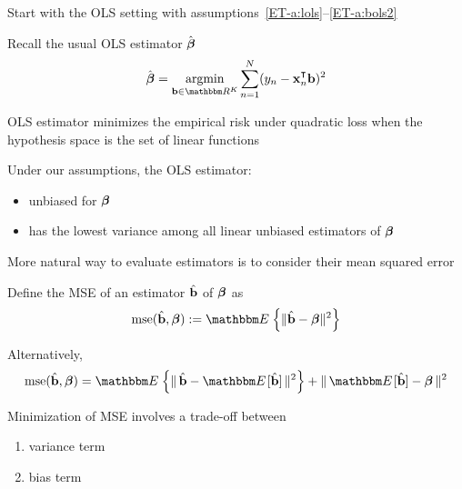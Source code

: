 \begin{frame}

    \vspace{2em}
    Start with the OLS setting with assumptions~\ref{ET-a:lols}--\ref{ET-a:bols2}
    
    Recall the usual OLS estimator $\hat {\boldsymbol \beta}$ 
    \begin{equation*}
        \hboldbeta = \argmin_{\boldb \in \RR^K} \sum_{n=1}^N (y_n - \boldx_n^\T \boldb)^2
    \end{equation*}
    
    \vspace{.7em}
    OLS estimator minimizes the
    empirical risk under quadratic loss when the hypothesis space is
    the set of linear functions
    
    Under our assumptions, the OLS estimator: 
    \begin{itemize}
        \item unbiased for ${\boldsymbol \beta}$
        \item has the lowest variance among all linear unbiased estimators of
    ${\boldsymbol \beta}$
    \end{itemize}
    
\end{frame}

\begin{frame}

    \vspace{2em}
    More natural way
    to evaluate estimators is to consider their mean squared error
    
    Define the MSE of an estimator $\hat {{\mathbf b}}$ of ${\boldsymbol \beta}$ as
    \begin{equation*}
        \mse(\hat \boldb, \boldbeta) := \EE \left\{ \| \hat \boldb - \boldbeta \|^2  \right\}
    \end{equation*}
    
    Alternatively,
    \begin{equation}
        \label{eq:dmse2}
        \mse(\hat \boldb, \boldbeta) 
        = \EE \left\{ \|  \, \hat \boldb - \EE[\hat \boldb] \, \|^2 \right\}
            + \| \, \EE[\hat \boldb] - \boldbeta \, \|^2 
    \end{equation}
    
    \vspace{.7em}
    Minimization of MSE involves a trade-off between
    \begin{enumerate}
        \item variance term
        \item bias term 
    \end{enumerate}
    
\end{frame}

